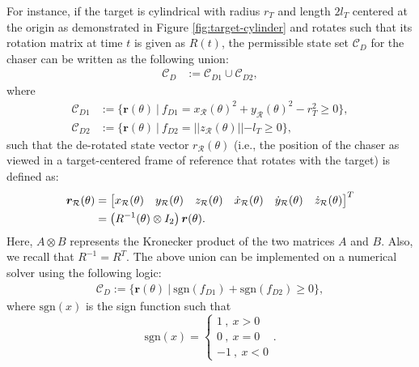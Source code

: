 For instance, if the target is cylindrical with radius $r_T$ and length $2l_T$ centered at the origin as demonstrated in Figure \ref{fig:target-cylinder} and rotates such that its rotation matrix at time $t$ is given as $R(t)$, the permissible state set ${\mathcal{C}}_D$ for the chaser can be written as the following union:
\begin{align}
    {\mathcal{C}}_D&:={\mathcal{C}}_{D1}\cup{\mathcal{C}}_{D2},\label{eqn:or-function}
\end{align}
where
\begin{subequations}
\begin{align}
    {\mathcal{C}}_{D1}&:=\{\boldsymbol{r}(\theta)\ |\ f_{D1}=x_{\mathcal{R}}(\theta)^2 + y_{\mathcal{R}}(\theta)^2 - r_T^2\geq0\},\\
    {\mathcal{C}}_{D2}&:=\{\boldsymbol{r}(\theta)\ |\ f_{D2}=||z_{\mathcal{R}}(\theta)|| - l_T\geq0\},
\end{align}
\end{subequations}
such that the de-rotated state vector $r_{\mathcal{R}}(\theta)$ (i.e., the position of the chaser as viewed in a target-centered frame of reference that rotates with the target) is defined as:
\begin{align}
    \boldsymbol{r}_{\mathcal{R}}(\theta)&=\begin{bmatrix}
        x_{\mathcal{R}}(\theta)&y_{\mathcal{R}}(\theta)&z_{\mathcal{R}}(\theta)&\dot{x}_{\mathcal{R}}(\theta)&\dot{y}_{\mathcal{R}}(\theta)&\dot{z}_{\mathcal{R}}(\theta)
    \end{bmatrix}^T\notag\\
    &=\left(R^{-1}(\theta)\otimes I_2\right)\boldsymbol{r}(\theta).
\end{align}
Here, $A\otimes B$ represents the Kronecker product of the two matrices $A$ and $B$.
Also, we recall that ${R}^{-1}={R}^T$.
The above union can be implemented on a numerical solver using the following logic:
\begin{align}
    {\mathcal{C}}_D:=\{\boldsymbol{r}(\theta)\ |\ \text{sgn}(f_{D1})+\text{sgn}(f_{D2})\geq0\},
\end{align}
where $\text{sgn}(x)$ is the sign function such that
\begin{equation}
    \text{sgn}(x) = \begin{cases}
        1\ ,\ x>0\\
        0\ ,\ x=0\\
        -1\ ,\ x<0
    \end{cases}.
\end{equation}

